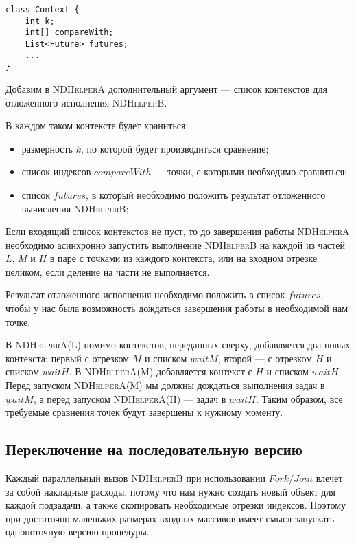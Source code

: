 \begin{lstlisting}[float=!h,caption={Вспомогательная структура <<контекст>> для \textsc{NDHelperA}}]
class Context {
    int k;
    int[] compareWith;
    List<Future> futures;
    ...
}
\end{lstlisting}

Добавим в \textsc{NDHelperA} дополнительный аргумент --- список контекстов для отложенного исполнения \textsc{NDHelperB}.

В каждом таком контексте будет храниться:
\begin{itemize}
    \item размерность $k$, по которой будет производиться сравнение;
    \item список индексов $compareWith$ --- точки, с которыми необходимо сравниться;
    \item список $futures$, в который необходимо положить результат отложенного вычисления \textsc{NDHelperB};
\end{itemize}

Если входящий список контекстов не пуст, то до завершения работы \textsc{NDHelperA} необходимо асинхронно запустить выполнение \textsc{NDHelperB} на каждой из частей $L$, $M$ и $H$ в паре с точками из каждого контекста, или на входном отрезке целиком, если деление на части не выполняется.

Результат отложенного исполнения необходимо положить в список $futures$, чтобы у нас была возможность дождаться завершения работы в необходимой нам точке.

В \textsc{NDHelperA(L)} помимо контекстов, переданных сверху, добавляется два новых контекста: первый с отрезком $M$ и списком $waitM$, второй --- с отрезком $H$ и списком $waitH$.
В \textsc{NDHelperA(M)} добавляется контекст с $H$ и списком $waitH$.
Перед запуском \textsc{NDHelperA(M)} мы должны дождаться выполнения задач в $waitM$, а перед запуском \textsc{NDHelperA(H)} --- задач в $waitH$.
Таким образом, все требуемые сравнения точек будут завершены к нужному моменту.

\subsection{Переключение на последовательную версию}
Каждый параллельный вызов \textsc{NDHelperB} при использовании $Fork/Join$ влечет за собой накладные расходы, потому что нам нужно создать новый объект для каждой подзадачи, а также скопировать необходимые отрезки индексов.
Поэтому при достаточно маленьких размерах входных массивов имеет смысл запускать однопоточную версию процедуры.

